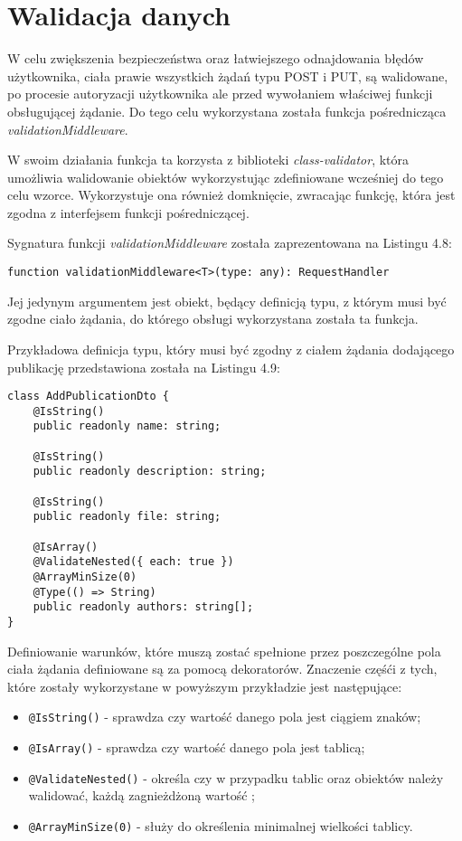 \documentclass[a4paper,12pt,twoside,openany]{report}
\begin{document}
\section{Walidacja danych}
W celu zwiększenia bezpieczeństwa oraz łatwiejszego odnajdowania błędów użytkownika, ciała prawie wszystkich żądań typu POST i PUT, są walidowane, po procesie autoryzacji użytkownika ale przed wywołaniem właściwej funkcji obsługującej żądanie. Do tego celu wykorzystana została funkcja pośrednicząca \textit{validationMiddleware}. 

W swoim działania funkcja ta korzysta z biblioteki \textit{class-validator}, która umożliwia walidowanie obiektów wykorzystując zdefiniowane wcześniej do tego celu wzorce. Wykorzystuje ona również domknięcie, zwracając funkcję, która jest zgodna z interfejsem funkcji pośredniczącej.

Sygnatura funkcji \textit{validationMiddleware} została zaprezentowana na Listingu 4.8: 

\begin{lstlisting}[caption=Sygnatura funkcji validationMiddleware,label=code1,captionpos=b]
function validationMiddleware<T>(type: any): RequestHandler
\end{lstlisting}
Jej jedynym argumentem jest obiekt, będący definicją typu, z którym musi być zgodne ciało żądania, do którego obsługi wykorzystana została ta funkcja.

Przykładowa definicja typu, który musi być zgodny z ciałem żądania dodającego publikację przedstawiona została na Listingu 4.9:
\begin{lstlisting}[caption=Klasa AddPublicationDto,label=code1,captionpos=b]
class AddPublicationDto {
	@IsString()
	public readonly name: string;
	
	@IsString()
	public readonly description: string;
	
	@IsString()
	public readonly file: string;
	
	@IsArray()
	@ValidateNested({ each: true })
	@ArrayMinSize(0)
	@Type(() => String)        
	public readonly authors: string[];
}
\end{lstlisting} 
\pagebreak

Definiowanie warunków, które muszą zostać spełnione przez poszczególne pola ciała żądania definiowane są za pomocą dekoratorów. Znaczenie częśći z tych, które zostały wykorzystane w powyższym przykładzie jest następujące: 
\begin{itemize}
	\item \verb|@IsString()| - sprawdza czy wartość danego pola jest ciągiem znaków;
	\item \verb|@IsArray()| - sprawdza czy wartość danego pola jest tablicą; 
	\item \verb|@ValidateNested()| - określa czy w przypadku tablic oraz obiektów należy walidować, każdą zagnieżdżoną wartość ;
	\item \verb|@ArrayMinSize(0)| - służy do określenia minimalnej wielkości tablicy.
\end{itemize}
\end{document}
